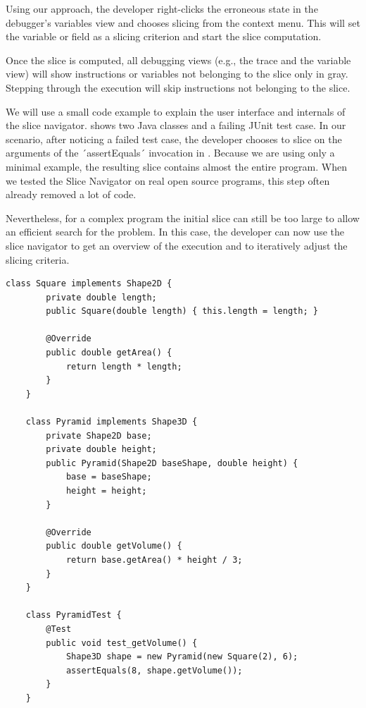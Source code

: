 ﻿\documentclass[
      english,
			conference,
      ]{IEEEtran}
\begin{document}
Using our approach, the developer right-clicks the erroneous state in the debugger's variables view and chooses slicing from the context menu.
This will set the variable or field as a slicing criterion and start the slice computation.

Once the slice is computed, all debugging views (e.g., the trace and the variable view) will show instructions or variables not belonging to the slice only in gray.
Stepping through the execution will skip instructions not belonging to the slice.

We will use a small code example to explain the user interface and internals of the slice navigator. 
 shows two Java classes and a failing JUnit test case.
In our scenario, after noticing a failed test case, the developer chooses to slice on the arguments of the ´assertEquals´ invocation in .
Because we are using only a minimal example, the resulting slice contains almost the entire program.
When we tested the Slice Navigator on real open source programs, this step often already removed a lot of code.

Nevertheless, for a complex program the initial slice can still be too large to allow an efficient search for the problem.
In this case, the developer can now use the slice navigator to get an overview of the execution and to iteratively adjust the slicing criteria.

\begin{lstlisting}[float=t,label=lst:example,caption={Example program with a failing test case}]
	class Square implements Shape2D {
		private double length;
		public Square(double length) { this.length = length; }
		
		@Override
		public double getArea() { 
			return length * length;
		}
	}
	
	class Pyramid implements Shape3D {
		private Shape2D base;
		private double height;
		public Pyramid(Shape2D baseShape, double height) {
			base = baseShape;
			height = height;
		}
		
		@Override
		public double getVolume() { 
			return base.getArea() * height / 3; 
		}
	}
	
	class PyramidTest {
		@Test
		public void test_getVolume() {
			Shape3D shape = new Pyramid(new Square(2), 6);
			assertEquals(8, shape.getVolume());
		}
	}
\end{lstlisting}
\end{document}
